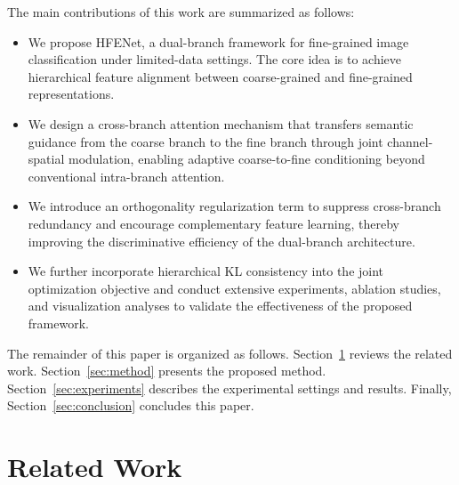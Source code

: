 \documentclass[pdflatex,iicol,sn-mathphys-num]{sn-jnl}
\theoremstyle{thmstyleone}%
\theoremstyle{thmstyletwo}%
\theoremstyle{thmstylethree}%
\begin{document}
The main contributions of this work are summarized as follows:
\begin{itemize}
    \item We propose HFENet, a dual-branch framework for fine-grained image classification under limited-data settings. The core idea is to achieve hierarchical feature alignment between coarse-grained and fine-grained representations.
    \item We design a cross-branch attention mechanism that transfers semantic guidance from the coarse branch to the fine branch through joint channel-spatial modulation, enabling adaptive coarse-to-fine conditioning beyond conventional intra-branch attention.
    \item We introduce an orthogonality regularization term to suppress cross-branch redundancy and encourage complementary feature learning, thereby improving the discriminative efficiency of the dual-branch architecture.
    \item We further incorporate hierarchical KL consistency into the joint optimization objective and conduct extensive experiments, ablation studies, and visualization analyses to validate the effectiveness of the proposed framework.
\end{itemize}

The remainder of this paper is organized as follows. 
Section~\ref{sec:related_work} reviews the related work. 
Section~\ref{sec:method} presents the proposed method. 
Section~\ref{sec:experiments} describes the experimental settings and results. 
Finally, Section~\ref{sec:conclusion} concludes this paper.

\section{Related Work}
\label{sec:related_work}
\end{document}
